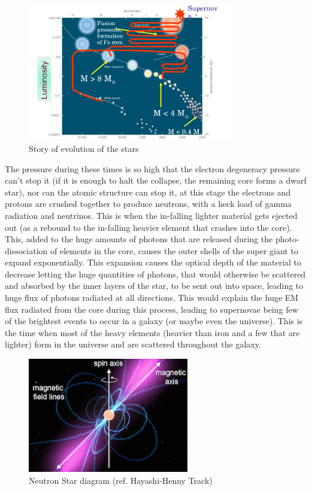 \documentclass[a4paper,twoside]{report}
\numberwithin{equation}{section}
\begin{document}
\paragraph{}
\begin{figure}
\includegraphics[width=1.0\linewidth, height=6cm]{evo_of_stars.jpg}
\caption{Story of evolution of the stars}
\label{NS_Diagram}
\end{figure}
The pressure during these times is so high that the electron degeneracy pressure can't stop it (if it is enough to halt the collapse, the remaining core forms a dwarf star), nor can the atomic structure can stop it, at this stage the electrons and protons are crushed together to produce neutrons, with a heck load of gamma radiation and neutrinos. This is when the in-falling lighter material gets ejected out (as a rebound to the in-falling heavier element that crashes into the core). This, added to the huge amounts of photons that are released during the photo-dissociation of elements in the core, causes the outer shells of the super giant to expand exponentially. This expansion causes the optical depth of the material to decrease letting the huge quantities of photons, that would otherwise be scattered and absorbed by the inner layers of the star, to be sent out into space, leading to huge flux of photons radiated at all directions. This would explain the huge EM flux radiated from the core during this process, leading to supernovae being few of the brightest events to occur in a galaxy (or maybe even the universe). This is the time when most of the heavy elements (heavier than iron and a few that are lighter) form in the universe and are scattered throughout the galaxy. 
\\
\begin{figure}
\includegraphics[width=1.0\linewidth, height=5cm]{ns_pulsar_diagram.png}
\caption{Neutron Star diagram (ref. Hayashi-Henny Track)}
\label{Star Evolution Diagram}
\end{figure}
\end{document}
